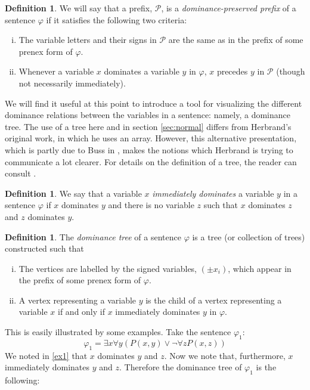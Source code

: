 \documentclass[a4paper,12pt]{report}
\theoremstyle{definition}
\newtheorem{mydef}[lem]{Definition}
\begin{document}
\begin{mydef}
\label{dp prefix}
We will say that a prefix, $\mathcal{P}$, is a \emph{dominance-preserved prefix} of a sentence $\varphi$ if it satisfies the following two criteria:
\begin{enumerate}[(i)]
\item The variable letters and their signs in $\mathcal{P}$ are the same as in the prefix of some prenex form of $\varphi$.
\item Whenever a variable $x$ dominates a variable $y$ in $\varphi$, $x$ precedes $y$ in $\mathcal{P}$ (though not necessarily immediately).
\end{enumerate}
\end{mydef} 

We will find it useful at this point to introduce a tool for visualizing the different dominance relations  between the variables in a sentence: namely, a dominance tree. The use of a tree here and in section \ref{sec:normal} differs from Herbrand's original work, in which he uses an array. However, this alternative presentation, which is partly due to Buss in \cite{buss OHT}, makes the notions which Herbrand is trying to communicate a lot clearer. For details on the definition of a tree, the reader can consult \cite{graph}.

\begin{mydef}
We say that a variable $x$ \emph{immediately dominates} a variable $y$ in a sentence $\varphi$ if $x$ dominates $y$ and there is no variable $z$ such that $x$ dominates $z$ and $z$ dominates $y$.
\end{mydef}

\begin{mydef}
The \emph{dominance tree} of a sentence $\varphi$ is a tree (or collection of trees) constructed such that
\begin{enumerate}[(i)]
\item The vertices are labelled by the signed variables, $ (\pm x_i) $, which appear in the prefix of some prenex form of $\varphi$. 
\item A vertex representing a variable $y$ is the child of a vertex representing a variable $x$ if and only if $x$ immediately dominates $y$ in $\varphi$.
\end{enumerate}
\end{mydef}

\noindent This is easily illustrated by some examples. Take the sentence $\varphi_1$:
$$
\varphi_1 = \exists x \forall y ( P(x , y) \lor \neg \forall z P(x,z))
$$
We noted in \ref{ex1} that $x$ dominates $y$ and $z$. Now we note that, furthermore, $x$ immediately dominates $y$ and $z$. Therefore the dominance tree of $\varphi_1$ is the following:
\\
\end{document}
